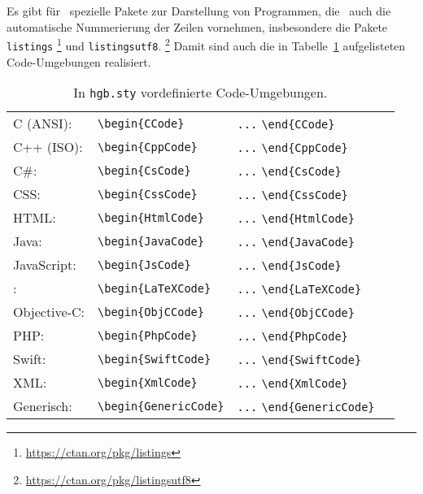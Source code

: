 Es gibt für \latex\ spezielle Pakete zur Darstellung von Programmen, die \ua\ auch die automatische
Nummerierung der Zeilen vornehmen, insbesondere die Pakete \texttt{listings}%
\footnote{\url{https://ctan.org/pkg/listings}}
und \texttt{listingsutf8}.%
\footnote{\url{https://ctan.org/pkg/listingsutf8}}
Damit sind auch die in Tabelle~\ref{tab:CodeUmgebungen} aufgelisteten Code-Umgebungen realisiert.
%
\begin{table}
\caption{In \nolinkurl{hgb.sty} vordefinierte Code-Umgebungen.}
\label{tab:CodeUmgebungen}
\centering
\begin{tabular}{llll}
	\hline
	C (ANSI): & \verb!\begin{CCode}! & \verb!...! \verb!\end{CCode}! \\
	C++ (ISO): & \verb!\begin{CppCode}! & \verb!...! \verb!\end{CppCode}! \\
	C\#: & \verb!\begin{CsCode}! & \verb!...! \verb!\end{CsCode}! \\
	CSS: & \verb!\begin{CssCode}! & \verb!...! \verb!\end{CssCode}! \\
	HTML: & \verb!\begin{HtmlCode}! & \verb!...! \verb!\end{HtmlCode}! \\
	Java: & \verb!\begin{JavaCode}! & \verb!...! \verb!\end{JavaCode}! \\
	JavaScript: & \verb!\begin{JsCode}! & \verb!...! \verb!\end{JsCode}! \\
	\latex: & \verb!\begin{LaTeXCode}! & \verb!...! \verb!\end{LaTeXCode}! \\
	Objective-C: & \verb!\begin{ObjCCode}! & \verb!...! \verb!\end{ObjCCode}! \\
	PHP: & \verb!\begin{PhpCode}! & \verb!...! \verb!\end{PhpCode}! \\
	Swift: & \verb!\begin{SwiftCode}! & \verb!...! \verb!\end{SwiftCode}! \\
	XML: & \verb!\begin{XmlCode}! & \verb!...! \verb!\end{XmlCode}! \\
	Generisch: & \verb!\begin{GenericCode}! & \verb!...! \verb!\end{GenericCode}! \\
	\hline
\end{tabular}
\end{table}
